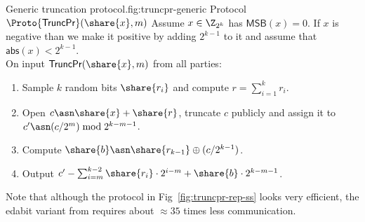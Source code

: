\begin{Boxfig}{Generic truncation protocol.}{fig:truncpr-generic}
  {Protocol $\Proto{\mathsf{TruncPr}}(\share{x}, m)$}
  Assume $x \in \Z_{2^k}$ has $\mathsf{MSB}(x) = 0$. If $x$ is negative than
  we make it positive by adding $2^{k-1}$ to it and assume that $\mathsf{abs}(x) < 2^{k-1}$.
  \\
  On input $\mathsf{TruncPr}(\share{x}, m)$ from all parties:
  \begin{enumerate}
    \item Sample $k$ random bits $\share{r_i}$ and compute $r = \sum_{i=1}^k
    r_i$. \item Open $c \asn \share{x} + \share{r}$, truncate $c$ publicly
    and
    assign it to $c' \asn (c/2^m) \bmod 2^{k-m-1}$.
    \item Compute $\share{b} \asn \share{r_{k-1}} \oplus (c / 2^{k-1})$.
    \item Output $c' - \sum_{i=m}^{k-2} \share{r_i} \cdot 2^{i-m} + \share{b}
    \cdot 2^{k-m-1}$.
  \end{enumerate}

\end{Boxfig}


Note that although the protocol in Fig~\ref{fig:truncpr-rep-ss} looks
very efficient, the edabit variant from \cite{C:EGKRS20} requires
about $\approx 35$ times less communication.

